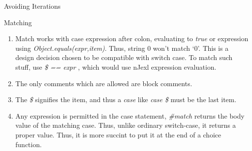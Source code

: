 \begin{section}{Avoiding Iterations}
\begin{subsection}{Matching}
\begin{enumerate}
\item{ Match works with case expression after colon, evaluating to \emph{true} 
       or expression using \emph{Object.equals(expr,item)}. Thus, string 0 won't match `0'. 
       This is a design decision chosen to be compatible with switch case. To match such stuff, use \emph{ \$ == expr },
       which would use nJexl expression evaluation. }
\item{ The only comments which are allowed are block comments. }
\item{ The \emph{\$} signifies the item, and thus a \emph{case} like \emph{ case  \$ } must be the last item. }
\item{ Any expression is permitted in the case statement, \emph{\#match} returns the body value of the matching case.
       Thus, unlike ordinary switch-case, it returns a proper value. Thus, it is more succint to put it 
       at the end of a choice function.
     }       
\end{enumerate}

\end{subsection}


\end{section}
